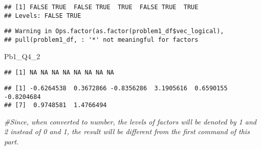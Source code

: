 \documentclass[]{article}
\newenvironment{Shaded}{\begin{snugshade}}{\end{snugshade}}
\newcommand{\CommentTok}[1]{\textcolor[rgb]{0.56,0.35,0.01}{\textit{#1}}}
\newcommand{\DecValTok}[1]{\textcolor[rgb]{0.00,0.00,0.81}{#1}}
\newcommand{\KeywordTok}[1]{\textcolor[rgb]{0.13,0.29,0.53}{\textbf{#1}}}
\newcommand{\NormalTok}[1]{#1}
\newcommand{\OperatorTok}[1]{\textcolor[rgb]{0.81,0.36,0.00}{\textbf{#1}}}
\newcommand{\StringTok}[1]{\textcolor[rgb]{0.31,0.60,0.02}{#1}}
\begin{document}
\begin{verbatim}
## [1] FALSE TRUE  FALSE TRUE  TRUE  FALSE TRUE  TRUE 
## Levels: FALSE TRUE
\end{verbatim}

\begin{Shaded}
\end{Shaded}

\begin{verbatim}
## Warning in Ops.factor(as.factor(problem1_df$vec_logical),
## pull(problem1_df, : '*' not meaningful for factors
\end{verbatim}

\begin{Shaded}
\begin{Highlighting}[]
\NormalTok{Pb1_Q4_}\DecValTok{2}
\end{Highlighting}
\end{Shaded}

\begin{verbatim}
## [1] NA NA NA NA NA NA NA NA
\end{verbatim}

\begin{Shaded}
\end{Shaded}

\begin{verbatim}
## [1] -0.6264538  0.3672866 -0.8356286  3.1905616  0.6590155 -0.8204684
## [7]  0.9748581  1.4766494
\end{verbatim}

\begin{Shaded}
\begin{Highlighting}[]
\CommentTok{#Since, when converted to number, the levels of factors will be denoted by 1 and 2 instead of 0 and 1, the result will be different from the first command of this part.}
\end{Highlighting}
\end{Shaded}
\end{document}
